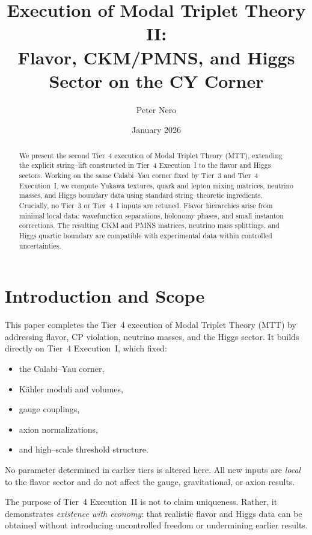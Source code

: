 \documentclass[11pt]{article}
\title{Execution of Modal Triplet Theory II:\\
Flavor, CKM/PMNS, and Higgs Sector on the CY Corner}
\author{Peter Nero}
\date{January 2026}
\begin{document}
\maketitle

\begin{abstract}
We present the second Tier~4 execution of Modal Triplet Theory (MTT),
extending the explicit string--lift constructed in Tier~4 Execution~I
to the flavor and Higgs sectors.
Working on the same Calabi--Yau corner fixed by Tier~3 and Tier~4
Execution~I, we compute Yukawa textures, quark and lepton mixing matrices,
neutrino masses, and Higgs boundary data using standard string--theoretic
ingredients.
Crucially, no Tier~3 or Tier~4~I inputs are retuned.
Flavor hierarchies arise from minimal local data: wavefunction
separations, holonomy phases, and small instanton corrections.
The resulting CKM and PMNS matrices, neutrino mass splittings, and Higgs
quartic boundary are compatible with experimental data within controlled
uncertainties.
\end{abstract}

\tableofcontents
\newpage

\section{Introduction and Scope}

This paper completes the Tier~4 execution of Modal Triplet Theory (MTT)
by addressing flavor, CP violation, neutrino masses, and the Higgs
sector.
It builds directly on Tier~4 Execution~I, which fixed:
\begin{itemize}
  \item the Calabi--Yau corner,
  \item K\"ahler moduli and volumes,
  \item gauge couplings,
  \item axion normalizations,
  \item and high--scale threshold structure.
\end{itemize}

No parameter determined in earlier tiers is altered here.
All new inputs are \emph{local} to the flavor sector and do not affect
the gauge, gravitational, or axion results.

The purpose of Tier~4 Execution~II is not to claim uniqueness.
Rather, it demonstrates \emph{existence with economy}:
that realistic flavor and Higgs data can be obtained without
introducing uncontrolled freedom or undermining earlier results.
\end{document}
